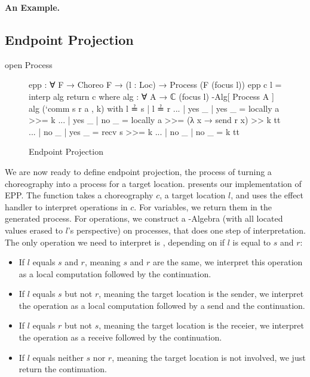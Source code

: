 \noindent \textbf{An Example.}

\subsection{Endpoint Projection} \label{sec:epp}

\begin{code}[hide]
open Process
\end{code}

\begin{figure}[ht]
\begin{code}
epp : ∀ {F} → Choreo F → (l : Loc) → Process (F (focus l))
epp c l = interp alg return c
  where
    alg : ∀ {A} → ℂ (focus l) -Alg[ Process A ]
    alg (`comm s r a , k) with l ≟ s | l ≟ r
    ... | yes _  | yes _  = locally a >>= k
    ... | yes _  | no  _  = locally a >>= (λ x → send r x) >> k tt
    ... | no  _  | yes _  = recv s >>= k
    ... | no  _  | no  _  = k tt
\end{code}
\caption{Endpoint Projection}
\label{fig:epp}
\end{figure}

We are now ready to define endpoint projection, the process of turning a choreography into a process for a target location.
%
 presents our implementation of EPP.
%
The function  takes a choreography $c$, a target location $l$, and uses the effect handler  to interpret operations in $c$.
%
For variables, we return them in the generated process.
%
For operations, we construct a -Algebra (with all located values erased to $l$'s perspective)  on processes, that does one step of interpretation.
%
The only operation we need to interpret is , depending on if $l$ is equal to $s$ and $r$:
%
\begin{itemize}
\item
  If $l$ equals $s$ and $r$, meaning $s$ and $r$ are the same, we interpret this operation as a local computation followed by the continuation.
\item
  If $l$ equals $s$ but not $r$, meaning the target location is the sender, we interpret the operation as a local computation followed by a send and the continuation.
\item
  If $l$ equals $r$ but not $s$, meaning the target location is the receier, we interpret the operation as a receive followed by the continuation.
\item
  If $l$ equals neither $s$ nor $r$, meaning the target location is not involved, we just return the continuation.
\end{itemize}
